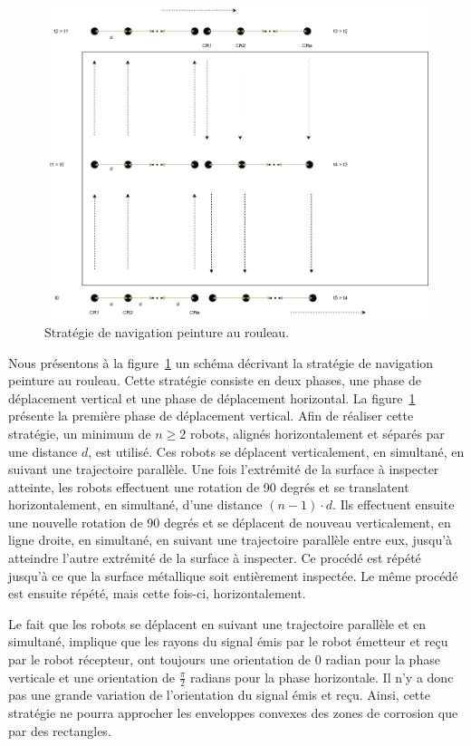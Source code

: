 \documentclass[francais,RandD]{rapportPFE}
\begin{document}
				\begin{figure}[h!]
					\centering
					\includegraphics[scale=0.5]{graphics/peinture_au_rouleau1.png}
					\caption{Stratégie de navigation peinture au rouleau.}
					\label{fig:peinture_au_rouleau1}
				\end{figure}

				Nous présentons à la figure~\ref{fig:peinture_au_rouleau1} un schéma décrivant la stratégie de navigation peinture au rouleau.
				Cette stratégie consiste en deux phases, une phase de déplacement vertical et une phase de déplacement horizontal.
				La figure~\ref{fig:peinture_au_rouleau1} présente la première phase de déplacement vertical.
				Afin de réaliser cette stratégie, un minimum de $n \ge 2$ robots, alignés horizontalement et séparés par une distance $d$, est utilisé.
				Ces robots se déplacent verticalement, en simultané, en suivant une trajectoire parallèle.
				Une fois l'extrémité de la surface à inspecter atteinte, les robots effectuent une rotation de 90 degrés et se translatent horizontalement, en simultané, d'une distance $(n - 1) \cdot d$.
				Ils effectuent ensuite une nouvelle rotation de 90 degrés et se déplacent de nouveau verticalement, en ligne droite, en simultané, en suivant une trajectoire parallèle entre eux, jusqu'à atteindre l'autre extrémité de la surface à inspecter.
				Ce procédé est répété jusqu'à ce que la surface métallique soit entièrement inspectée.
				Le même procédé est ensuite répété, mais cette fois-ci, horizontalement.

				Le fait que les robots se déplacent en suivant une trajectoire parallèle et en simultané, implique que les rayons du signal émis par le robot émetteur et reçu par le robot récepteur, ont toujours une orientation de $0$ radian pour la phase verticale et une orientation de $\frac{\pi}{2}$ radians pour la phase horizontale.
				Il n'y a donc pas une grande variation de l'orientation du signal émis et reçu.
				Ainsi, cette stratégie ne pourra approcher les enveloppes convexes des zones de corrosion que par des rectangles.
\end{document}
